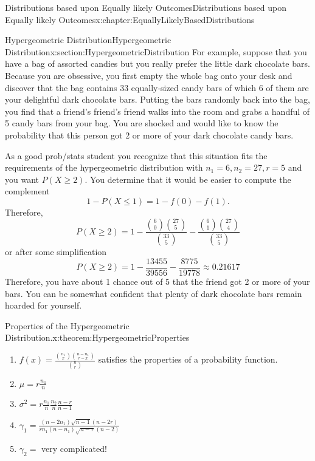 \documentclass[oneside,10pt,]{book}
\numberwithin{equation}{section}
\begin{document}
\begin{chapterptx}{Distributions based upon Equally likely Outcomes}{}{Distributions based upon Equally likely Outcomes}{}{}{x:chapter:EquallyLikelyBasedDistributions}
\begin{sectionptx}{Hypergeometric Distribution}{}{Hypergeometric Distribution}{}{}{x:section:HypergeometricDistribution}
For example, suppose that you have a bag of assorted candies but you really prefer the little dark chocolate bars. Because you are obsessive, you first empty the whole bag onto your desk and discover that the bag contains 33 equally-sized candy bars of which 6 of them are your delightful dark chocolate bars. Putting the bars randomly back into the bag, you find that a friend's friend's friend walks into the room and grabs a handful of 5 candy bars from your bag. You are shocked and would like to know the probability that this person got 2 or more of your dark chocolate candy bars.%
\par
As a good prob\slash{}stats student you recognize that this situation fits the requirements of the hypergeometric distribution with \(n_1 = 6, n_2 = 27, r=5\) and you want \(P(X \ge 2)\).  You determine that it would be easier to compute the complement%
\begin{equation*}
1 - P(X \le 1) = 1 - f(0) - f(1).
\end{equation*}
Therefore,%
\begin{equation*}
P (X \ge 2) = 1 - \frac{\binom{6}{0} \binom{27}{5}}{\binom{33}{5}} - \frac{\binom{6}{1} \binom{27}{4}}{\binom{33}{5}}
\end{equation*}
or after some simplification%
\begin{equation*}
P (X \ge 2) = 1 - \frac{13455}{39556} - \frac{8775}{19778} \approx 0.21617
\end{equation*}
Therefore, you have about 1 chance out of 5 that the friend got 2 or more of your bars. You can be somewhat confident that plenty of dark chocolate bars remain hoarded for yourself.%
\begin{theorem}{Properties of the Hypergeometric Distribution.}{}{x:theorem:HypergeometricProperties}%
%
\begin{enumerate}
\item{}\(f(x) = \frac{\binom{n_1}{x} \binom{n-n_1}{r-x}}{\binom{n}{r}}\) satisfies the properties of a probability function.%
\item{}\(\displaystyle \mu = r \frac{n_1}{n}\)%
\item{}\(\displaystyle \sigma^2 = r \frac{n_1}{n} \frac{n_2}{n} \frac{n-r}{n-1}\)%
\item{}\(\displaystyle \gamma_1 = \frac{(n - 2 n_1)\sqrt{n-1}(n - 2r)}{r n_1 (n - n_1) \sqrt{n-r}(n-2)}\)%
\item{}\(\gamma_2 = \) very complicated!%
\end{enumerate}
%
\end{theorem}

\end{sectionptx}
\end{chapterptx}
\end{document}
